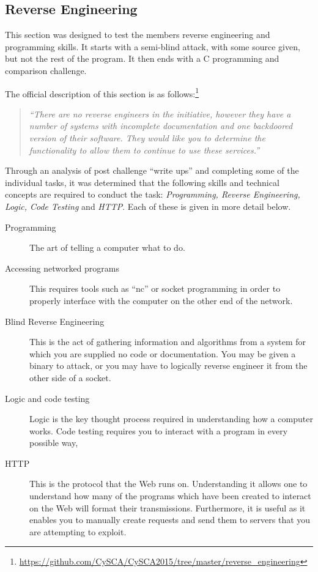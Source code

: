 \documentclass[twoside,a4paper,11pt]{report}
\begin{document}
		\subsection{Reverse Engineering}
			This section was designed to test the members reverse engineering and programming skills. 
			It starts with a semi-blind attack, with some source given, but not the rest of the program. 
			It then ends with a C programming and comparison challenge. 
			
			The official description of this section is as follows:\footnote{\url{https://github.com/CySCA/CySCA2015/tree/master/reverse\_engineering}}
			\begin{quote}
				\textit{``There are no reverse engineers in the initiative, however they have a number of systems with incomplete documentation and one backdoored version of their software. They would like you to determine the functionality to allow them to continue to use these services.''}
			\end{quote}

			Through an analysis of post challenge ``write ups'' and completing some of the individual tasks, 
			it was determined that the following skills and technical concepts are required to conduct the task: 
			\textit{Programming, Reverse Engineering, Logic, Code Testing} and \textit{HTTP}.
			Each of these is given in more detail below. 
			\begin{description}
				\item[Programming]
					The art of telling a computer what to do. 
				\item[Accessing networked programs] 
					This requires tools such as ``nc'' or socket programming in order to properly interface with the computer on the other end of the network. 
				\item[Blind Reverse Engineering] 
					This is the act of gathering information and algorithms from a system for which you are supplied no code or documentation. 
					You may be given a binary to attack, or you may have to logically reverse engineer it from the other side of a socket. 
				\item[Logic and code testing] 
					Logic is the key thought process required in understanding how a computer works. 
					Code testing requires you to interact with a program in every possible way, 
				\item[HTTP] 
					This is the protocol that the Web runs on. 
					Understanding it allows one to understand how many of the programs which have been created to interact on the Web will format their transmissions. 
					Furthermore, it is useful as it enables you to manually create requests and send them to servers that you are attempting to exploit. 
			\end{description}
\end{document}
